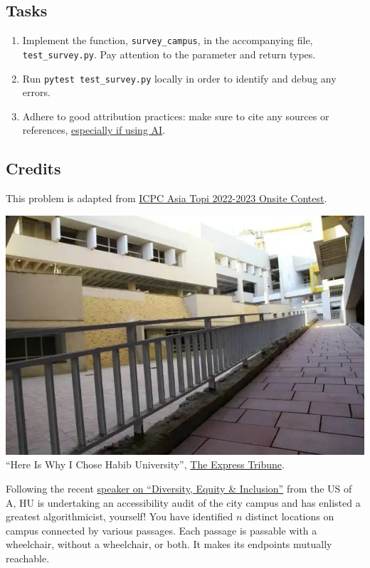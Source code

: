 \documentclass[a4paper]{exam}
\begin{document}
\begin{questions}
  \subsection*{Tasks}
  \begin{enumerate}
  \item Implement the function, \texttt{survey\_campus}, in the accompanying file, \texttt{test\_survey.py}. Pay attention to the parameter and return types.
  \item Run \texttt{pytest test\_survey.py} locally in order to identify and debug any errors.
  \item Adhere to good attribution practices: make sure to cite any sources or references, \href{https://hulms.instructure.com/courses/2616/discussion_topics/29240}{especially if using AI}.
  \end{enumerate}

  \subsection*{Credits}
  This problem is adapted from \href{https://giki.edu.pk/icpc/}{ICPC Asia Topi 2022-2023 Onsite Contest}.
  \newpage  


  \begin{center}
    \includegraphics[width=.7\textwidth]{ramp}\\
    \small ``Here Is Why I Chose Habib University'', \href{https://tribune.com.pk/article/22246/here-is-why-i-chose-habib-university}{The Express Tribune}.
  \end{center}

  Following the recent \href{https://www.facebook.com/karachi.usconsulate/posts/pfbid0sb9UC6H9KPnS7fmHSpNQiHQrzXDAFhRKwWRiLD7tjDwQpyuUQKrm6vXfYH2xYUG9l}{speaker on ``Diversity, Equity \& Inclusion''} from the US of A, HU is undertaking an accessibility audit of the city campus and has enlisted a greatest algorithmicist, yourself! You have identified $n$ distinct locations on campus connected by various passages. Each passage is passable with a wheelchair, without a wheelchair, or both. It makes its endpoints mutually reachable.


\end{questions}
\end{document}
